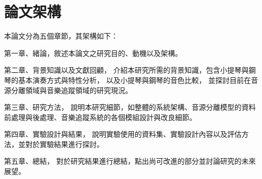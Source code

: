 \documentclass[class=NCU_thesis, crop=false]{standalone}
\begin{document}



\pagebreak

\section{論文架構}
本論文分為五個章節，其架構如下：

第一章、緒論，敘述本論文之研究目的、動機以及架構。

第二章、背景知識以及文獻回顧，
介紹本研究所需的背景知識，包含小提琴與鋼琴的基本演奏方式與特性分析，
以及小提琴與鋼琴的音色比較，
並探討目前在音源分離領域與音樂追蹤領域的研究現況。

第三章、研究方法，
說明本研究細節，如整體的系統架構、音源分離模型的資料前處理與後處理、音樂追蹤系統的各個模組設計與改良細節。

第四章、實驗設計與結果，
說明實驗使用的資料集、實驗設計內容以及評估方法，並對於實驗結果進行探討。

第五章、總結，
對於研究結果進行總結，點出尚可改進的部分並討論研究的未來展望。

\pagebreak
\end{document}
